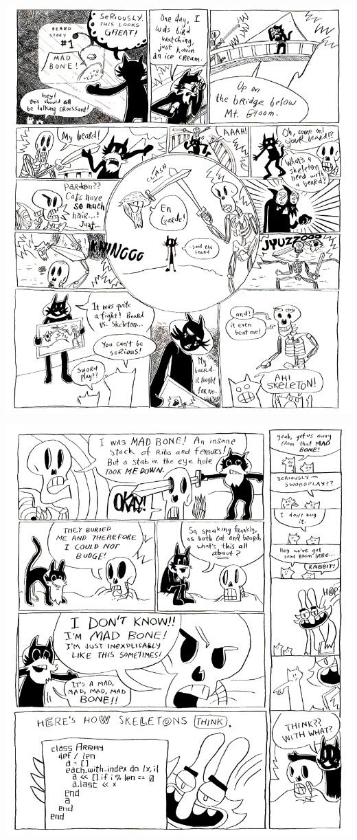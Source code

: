 \documentclass[10pt,twoside]{report}
\begin{document}
\vspace*{0.6cm} \includegraphics[width=1.0\textwidth]{cache/90.png}
\newpage

\vspace*{0.6cm} \includegraphics[width=1.0\textwidth]{cache/91.png}
\newpage
\end{document}
